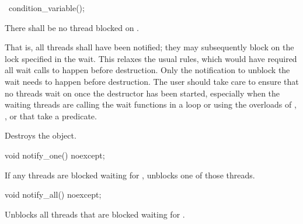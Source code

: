 %
\begin{itemdecl}
~condition_variable();
\end{itemdecl}

\begin{itemdescr}
\pnum
\requires There shall be no thread blocked on . \begin{note} That is, all
threads shall have been notified; they may subsequently block on the lock specified in the
wait.
This relaxes the usual rules, which would have required all wait calls to happen before
destruction. Only the notification to unblock the wait needs to happen before destruction.
The user should take care to ensure that no threads wait on  once the destructor has
been started, especially when the waiting threads are calling the wait functions in a loop or
using the overloads of , , or  that take a predicate.
\end{note}

\pnum\effects Destroys the object.
\end{itemdescr}

%
\begin{itemdecl}
void notify_one() noexcept;
\end{itemdecl}

\begin{itemdescr}
\pnum\effects If any threads are blocked waiting for , unblocks one of those threads.
\end{itemdescr}

%
\begin{itemdecl}
void notify_all() noexcept;
\end{itemdecl}



\begin{itemdescr}
\pnum\effects Unblocks all threads that are blocked waiting for .
\end{itemdescr}

